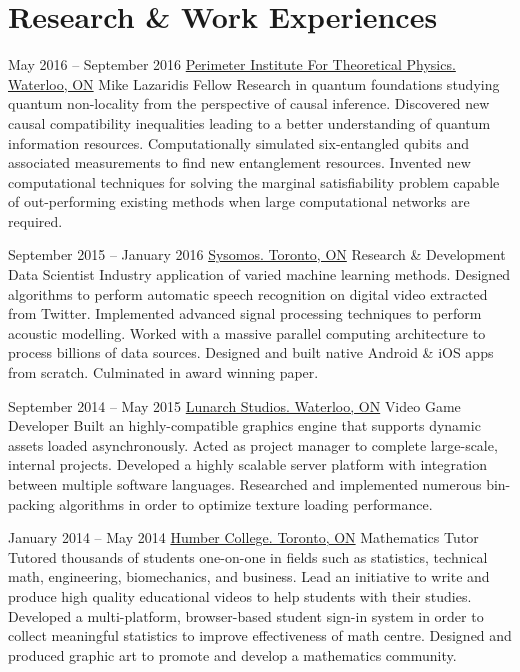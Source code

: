 \documentclass{article}
\begin{document}
    \section{Research \& Work Experiences}
    \begin{experiencelist}
        \item{
            May 2016 -- September 2016
        }{
            \href{http://www.perimeterinstitute.ca}{Perimeter Institute For Theoretical Physics. Waterloo, ON}
        }{
            Mike Lazaridis Fellow
        }{
            Research in quantum foundations studying quantum non-locality from the perspective of causal inference. Discovered new causal compatibility inequalities leading to a better understanding of quantum information resources. Computationally simulated six-entangled qubits and associated measurements to find new entanglement resources. Invented new computational techniques for solving the marginal satisfiability problem capable of out-performing existing methods when large computational networks are required.
        }

        \item{
            September 2015 -- January 2016
            }{
                \href{http://www.sysomos.com}{Sysomos. Toronto, ON}
            }{
                Research \& Development Data Scientist
            }{
                Industry application of varied machine learning methods. Designed algorithms to perform automatic speech recognition on digital video extracted from Twitter. Implemented advanced signal processing techniques to perform acoustic modelling. Worked with a massive parallel computing architecture to process billions of data sources. Designed and built native Android \& iOS apps from scratch. Culminated in award winning paper.
            }

        \item{
            September 2014 -- May 2015
            }{
                \href{http://www.lunarchstudios.com}{Lunarch Studios. Waterloo, ON}
            }{
                Video Game Developer
            }{
                Built an highly-compatible graphics engine that supports dynamic assets loaded asynchronously. Acted as project manager to complete large-scale, internal projects. Developed a highly scalable server platform with integration between multiple software languages. Researched and implemented numerous bin-packing algorithms in order to optimize texture loading performance.
            }

        \item{
            January 2014 -- May 2014
            }{
                \href{http://www.humber.ca}{Humber College. Toronto, ON}
            }{
                Mathematics Tutor
            }{
                Tutored thousands of students one-on-one in fields such as statistics, technical math, engineering, biomechanics, and business. Lead an initiative to write and produce high quality educational videos to help students with their studies. Developed a multi-platform, browser-based student sign-in system in order to collect meaningful statistics to improve effectiveness of math centre. Designed and produced graphic art to promote and develop a mathematics community.
            }


\end{experiencelist}
\end{document}
